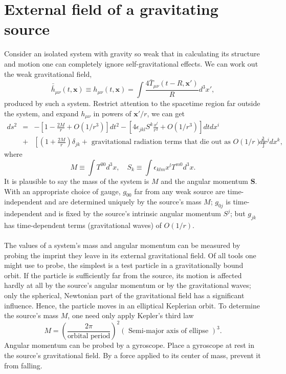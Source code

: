 \section{External field of a gravitating source}
Consider an isolated system with gravity so weak that in calculating its structure and motion one can completely ignore self-gravitational effects. We can work out the weak gravitational field,
\[\bar{\bar{h}}_{\mu\nu}(t,\bm{x}) \equiv h_{\mu\nu}(t,\bm{x}) = \int \frac{4\bar{T}_{\mu\nu}(t-R,\bm{x}')}{R} d^3x',\]
produced by such a system. Restrict attention to the spacetime region far outside the system, and expand $h_{\mu\nu}$ in powers of $\bm{x}' / {r}$, we can get
\begin{eqnarray}
ds^2 &=& -\left[1-\frac{2M}{r} + O({1}/{r^3}) \right]dt^2 - \left[4\epsilon_{jkl}S^k \frac{x^l}{r^3} + O({1}/{r^3})  \right] dtdx^i  \nonumber \\
&+& \left[(1+\frac{2M}{r})\delta_{jk} + \mbox{ gravitational radiation terms that die out as } O(1/r) \right]dx^j dx^k , \nonumber
\end{eqnarray}
where
\[M \equiv \int T^{00}d^3x , \quad S_k \equiv \int \epsilon_{klm}x^l T^{m0} d^3x .\]
It is plausible to say the mass of the system is $M$ and the angular momentum $\bm{S}$. With an appropriate choice of gauge, $g_{00}$ far from any weak source are time-independent and are determined uniquely by the source's mass $M$; $g_{0j}$ is time-independent and is fixed by the source's intrinsic angular momentum $S^j$; but $g_{jk}$ has time-dependent terms (gravitational waves) of $O(1/r)$.
\\ \\
The values of a system's mass and angular momentum can be measured by probing the imprint they leave in its external gravitational field. 
Of all tools one might use to probe, the simplest is a test particle in a gravitationally bound orbit. 
If the particle is sufficiently far from the source, its motion is affected hardly at all by the source's angular momentum or by the gravitational waves; only the spherical, Newtonian part of the gravitational field has a significant influence. 
Hence, the particle moves in an elliptical Keplerian orbit. To determine the source's mass $M$, one need only apply Kepler's third law
\[M = \left( \frac{2\pi}{\mbox{orbital period}} \right)^2 \left(\mbox{ Semi-major axis of ellipse } \right)^3.\]
Angular momentum can be probed by a gyroscope.
Place a gyroscope at rest in the source's gravitational field.
By a force applied to its center of mass, prevent it from falling. 
